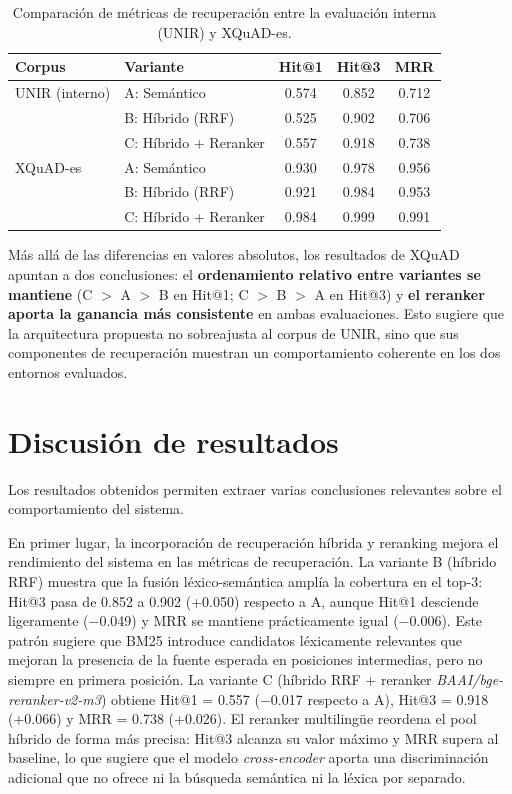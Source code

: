 \begin{table}[H]
\centering
\begin{tabular}{llccc}
\toprule
\textbf{Corpus} & \textbf{Variante} & \textbf{Hit@1} & \textbf{Hit@3} & \textbf{MRR} \\
\midrule
UNIR (interno) & A: Semántico          & 0.574 & 0.852 & 0.712 \\
               & B: Híbrido (RRF)      & 0.525 & 0.902 & 0.706 \\
               & C: Híbrido + Reranker & 0.557 & 0.918 & 0.738 \\
\midrule
XQuAD-es       & A: Semántico          & 0.930 & 0.978 & 0.956 \\
               & B: Híbrido (RRF)      & 0.921 & 0.984 & 0.953 \\
               & C: Híbrido + Reranker & 0.984 & 0.999 & 0.991 \\
\bottomrule
\end{tabular}
\caption{Comparación de métricas de recuperación entre la evaluación interna (UNIR) y XQuAD-es.}
\label{tab:xquad-vs-interno}
\end{table}

Más allá de las diferencias en valores absolutos, los resultados de XQuAD apuntan a dos conclusiones: el \textbf{ordenamiento relativo entre variantes se mantiene} (C $>$ A $>$ B en Hit@1; C $>$ B $>$ A en Hit@3) y \textbf{el reranker aporta la ganancia más consistente} en ambas evaluaciones.
Esto sugiere que la arquitectura propuesta no sobreajusta al corpus de UNIR, sino que sus componentes de recuperación muestran un comportamiento coherente en los dos entornos evaluados.

\section{Discusión de resultados}\label{sec:discusion-resultados}

Los resultados obtenidos permiten extraer varias conclusiones relevantes sobre el comportamiento del sistema.

En primer lugar, la incorporación de recuperación híbrida y reranking mejora el rendimiento del sistema en las métricas de recuperación. 
La variante B (híbrido RRF) muestra que la fusión léxico-semántica amplía la cobertura en el top-3: Hit@3 pasa de 0.852 a 0.902 (+0.050) respecto a A, aunque Hit@1 desciende ligeramente ($-$0.049) y MRR se mantiene prácticamente igual ($-$0.006). 
Este patrón sugiere que BM25 introduce candidatos léxicamente relevantes que mejoran la presencia de la fuente esperada en posiciones intermedias, pero no siempre en primera posición. 
La variante C (híbrido RRF + reranker \textit{BAAI/bge-reranker-v2-m3}) obtiene Hit@1 = 0.557 ($-$0.017 respecto a A), Hit@3 = 0.918 (+0.066) y MRR = 0.738 (+0.026). 
El reranker multilingüe reordena el pool híbrido de forma más precisa: Hit@3 alcanza su valor máximo y MRR supera al baseline, lo que sugiere que el modelo \textit{cross-encoder} aporta una discriminación adicional que no ofrece ni la búsqueda semántica ni la léxica por separado.

